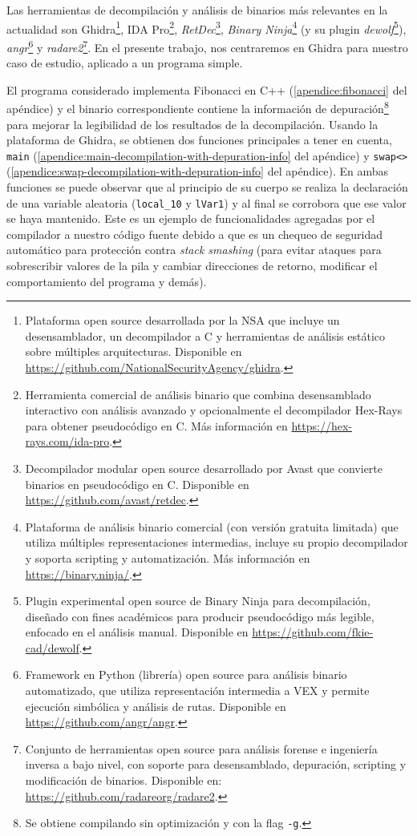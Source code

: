 \documentclass[runningheads]{llncs}
\begin{document}
Las herramientas de decompilación y análisis de binarios más relevantes en la actualidad son 
Ghidra\footnote{Plataforma open source desarrollada por la NSA que incluye un desensamblador, 
un decompilador a C y herramientas de análisis estático sobre múltiples arquitecturas. Disponible 
en \url{https://github.com/NationalSecurityAgency/ghidra}.}, IDA Pro\footnote{Herramienta 
comercial de análisis binario que combina desensamblado interactivo con análisis avanzado y 
opcionalmente el decompilador Hex-Rays para obtener pseudocódigo en C. Más información 
en \url{https://hex-rays.com/ida-pro}.}, \textit{RetDec}\footnote{Decompilador modular open source 
desarrollado por Avast que convierte binarios en pseudocódigo en C. Disponible 
en \url{https://github.com/avast/retdec}.}, \textit{Binary Ninja}\footnote{Plataforma de análisis 
binario comercial (con versión gratuita limitada) que utiliza múltiples representaciones intermedias, 
incluye su propio decompilador y soporta scripting y automatización. Más información 
en \url{https://binary.ninja/}.} (y su plugin \textit{dewolf}\footnote{Plugin experimental open 
source de Binary Ninja para decompilación, diseñado con fines académicos para producir pseudocódigo 
más legible, enfocado en el análisis manual. Disponible en \url{https://github.com/fkie-cad/dewolf}.}), 
\textit{angr}\footnote{Framework en Python (librería) open source para análisis binario automatizado, 
que utiliza representación intermedia a VEX y permite ejecución simbólica y análisis de rutas.
Disponible en \url{https://github.com/angr/angr}.} y \textit{radare2}\footnote{Conjunto de herramientas 
open source para análisis forense e ingeniería inversa a bajo nivel, con soporte para desensamblado,
depuración, scripting y modificación de binarios. Disponible en: 
\url{https://github.com/radareorg/radare2}.}. En el presente trabajo, nos centraremos en 
Ghidra para nuestro caso de estudio, aplicado a un programa simple.

El programa considerado implementa Fibonacci en C++ (\autoref{apendice:fibonacci} del apéndice) y el binario correspondiente contiene 
la información de depuración\footnote{Se obtiene compilando sin optimización y con la flag \texttt{-g}.}
para mejorar la legibilidad de los resultados de la decompilación. Usando la plataforma de Ghidra,
se obtienen dos funciones principales a tener en cuenta, \verb|main| (\autoref{apendice:main-decompilation-with-depuration-info} del apéndice) y \verb|swap<>| (\autoref{apendice:swap-decompilation-with-depuration-info} del apéndice).
En ambas funciones se puede observar que al principio de su cuerpo se realiza la declaración de una variable 
aleatoria (\verb|local_10| y \verb|lVar1|) y al final se corrobora que ese valor se haya mantenido. 
Este es un ejemplo de funcionalidades agregadas por el compilador a nuestro código fuente debido a que 
es un chequeo de seguridad automático para protección contra \textit{stack smashing} (para evitar 
ataques para sobrescribir valores de la pila y cambiar direcciones de retorno, modificar el comportamiento 
del programa y demás).
\end{document}
